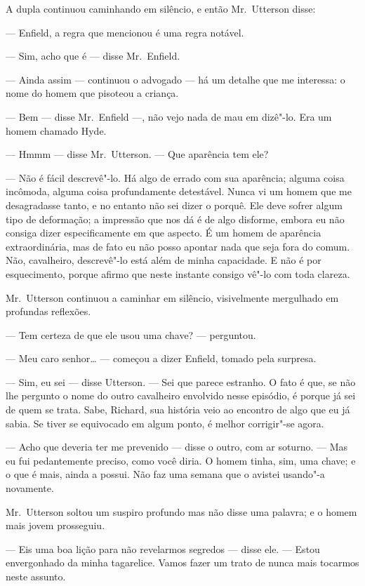 A dupla continuou caminhando em silêncio, e então Mr.~Utterson disse:

--- Enfield, a regra que mencionou é uma regra notável.

--- Sim, acho que é --- disse Mr.~Enfield.

--- Ainda assim --- continuou o advogado --- há um detalhe que me interessa:
o nome do homem que pisoteou a criança.

--- Bem --- disse Mr.~Enfield ---, não vejo nada de mau em dizê"-lo.  Era um
homem chamado Hyde.

--- Hmmm --- disse Mr.~Utterson. --- Que aparência tem ele?

--- Não é fácil descrevê"-lo.  Há algo de errado com sua aparência;
alguma coisa incômoda, alguma coisa profundamente detestável.  Nunca vi
um homem que me desagradasse tanto, e no entanto não sei dizer o
porquê.  Ele deve sofrer algum tipo de deformação; a impressão que nos
dá é de algo disforme, embora eu não consiga dizer especificamente em
que aspecto.  É um homem de aparência extraordinária, mas de fato eu
não posso apontar nada que seja fora do comum.  Não, cavalheiro,
descrevê"-lo está além de minha capacidade.  E não é por esquecimento,
porque afirmo que neste instante consigo vê"-lo com toda clareza.

Mr.~Utterson continuou a caminhar em silêncio, visivelmente mergulhado
em profundas reflexões.

--- Tem certeza de que ele usou uma chave? --- perguntou.

--- Meu caro senhor\ldots{} --- começou a dizer Enfield, tomado pela surpresa.

--- Sim, eu sei --- disse Utterson. --- Sei que parece estranho.  O fato é
que, se não lhe pergunto o nome do outro cavalheiro envolvido nesse
episódio, é porque já sei de quem se trata.  Sabe, Richard, sua
história veio ao encontro de algo que eu já sabia.  Se tiver se
equivocado em algum ponto, é melhor corrigir"-se agora.

--- Acho que deveria ter me prevenido --- disse o outro, com ar soturno. ---
Mas eu fui pedantemente preciso, como você diria.  O homem tinha, sim,
uma chave; e o que é mais, ainda a possui.  Não faz uma semana que o
avistei usando"-a novamente. 

Mr.~Utterson soltou um suspiro profundo mas não disse uma palavra; e o
homem mais jovem prosseguiu.

--- Eis uma boa lição para não revelarmos segredos --- disse ele. --- Estou		
envergonhado da minha tagarelice.  Vamos fazer um trato de nunca mais
tocarmos neste assunto.

